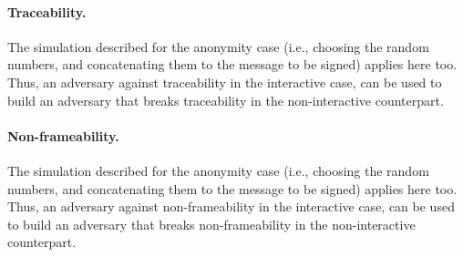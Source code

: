 \paragraph{Traceability.} The simulation described for the anonymity case (i.e.,
\advB choosing the random numbers, and concatenating them to the message to be
signed) applies here too. Thus, an adversary against traceability in the
interactive case, can be used to build an adversary that breaks traceability in
the non-interactive counterpart.

\paragraph{Non-frameability.} The simulation described for the anonymity case
(i.e., \advB choosing the random numbers, and concatenating them to the message
to be signed) applies here too. Thus, an adversary against non-frameability in
the interactive case, can be used to build an adversary that breaks
non-frameability in the non-interactive counterpart. 

